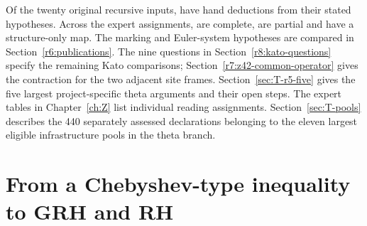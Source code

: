 Of the twenty original recursive inputs, \TrustOriginalComplete{} have hand deductions from their stated hypotheses. Across the \TrustUnits{} expert assignments, \TrustComplete{} are complete, \TrustPartial{} are partial and \TrustStructure{} have a structure-only map. The marking and Euler-system hypotheses are compared in Section~\ref{r6:publications}. The nine questions in Section~\ref{r8:kato-questions} specify the remaining Kato comparisons; Section~\ref{r7:z42-common-operator} gives the contraction for the two adjacent site frames. Section~\ref{sec:T-r5-five} gives the five largest project-specific theta arguments and their open steps. The expert tables in Chapter~\ref{ch:Z} list
individual reading assignments. Section~\ref{sec:T-pools} describes the
440 separately assessed declarations belonging to the eleven largest
eligible infrastructure pools in the theta branch.


\chapter{From a Chebyshev-type inequality to GRH and RH}\label{ch:E}


